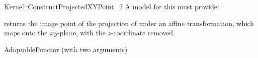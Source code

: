 \begin{ccRefFunctionObjectConcept}{Kernel::ConstructProjectedXYPoint_2}
A model for this must provide:


       {returns the image point of the projection of  under an affine
        transformation, which maps  onto the $xy$-plane, with the
        $z$-coordinate removed.}

\ccRefines
AdaptableFunctor (with two arguments)

\ccSeeAlso
{}\\

\end{ccRefFunctionObjectConcept}
